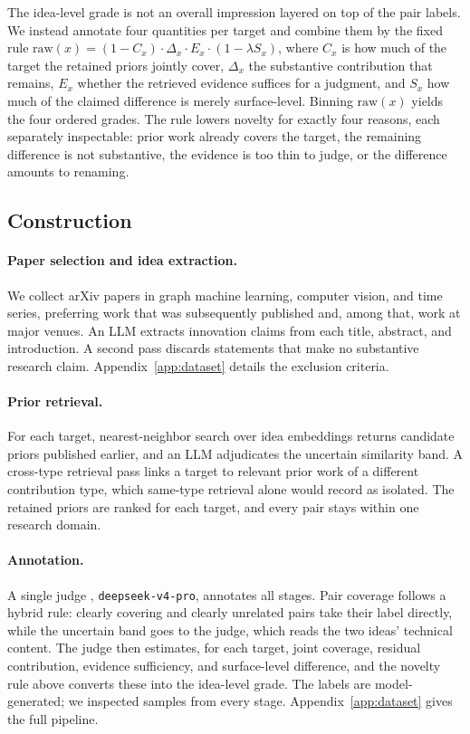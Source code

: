 The idea-level grade is not an overall impression layered on top of the pair
labels. We instead annotate four quantities per target and combine them by the
fixed rule
$\mathrm{raw}(x)=(1-C_x)\cdot\Delta_x\cdot E_x\cdot(1-\lambda S_x)$,
where $C_x$ is how much of the target the retained priors jointly cover,
$\Delta_x$ the substantive contribution that remains, $E_x$ whether the
retrieved evidence suffices for a judgment, and $S_x$ how much of the claimed
difference is merely surface-level. Binning $\mathrm{raw}(x)$ yields the four
ordered grades. The rule lowers novelty for exactly four reasons, each
separately inspectable: prior work already covers the target, the remaining
difference is not substantive, the evidence is too thin to judge, or the
difference amounts to renaming.

\subsection{Construction}
\label{sec:dataset-construction}

\paragraph{Paper selection and idea extraction.}
We collect arXiv papers in graph machine learning, computer vision, and time
series, preferring work that was subsequently published and, among that, work
at major venues. An LLM extracts innovation claims from each title, abstract,
and introduction. A second pass discards statements that make no substantive
research claim. Appendix~\ref{app:dataset} details the exclusion criteria.

\paragraph{Prior retrieval.}
For each target, nearest-neighbor search over idea embeddings
\citep{cohan2020specter,karpukhin2020dpr} returns candidate
priors published earlier, and an LLM adjudicates the uncertain similarity band.
A cross-type retrieval pass links a target to relevant prior work of a
different contribution type, which same-type retrieval alone would record as
isolated. The retained priors are ranked for each target, and every pair
stays within one research domain.

\paragraph{Annotation.}
A single judge \citep{zheng2023llmjudge,li2025llmjudge},
\texttt{deepseek-v4-pro}, annotates all stages. Pair coverage
follows a hybrid rule: clearly covering and clearly unrelated pairs take their
label directly, while the uncertain band goes to the judge, which reads the two
ideas' technical content. The judge then estimates, for each target, joint coverage, residual
contribution, evidence sufficiency, and surface-level difference, and
the novelty rule above converts these into the idea-level grade. The
labels are model-generated; we inspected samples from every stage.
Appendix~\ref{app:dataset} gives the full pipeline.

